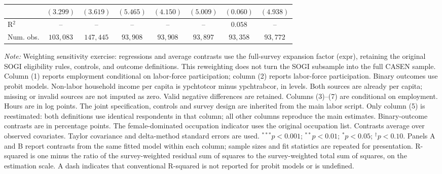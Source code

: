 \begin{table}[htpb!]
{\begin{tabular}{l c c c c c c c}
 & $(3.299)$ & $(3.619)$ & $(5.465)$ & $(4.150)$ & $(5.009)$ & $(0.060)$ & $(4.938)$ \\
\hline
R$^2$ & -- & -- & -- & -- & -- & $0.058$ & -- \\
Num. obs. & $103,083$ & $147,445$ & $93,908$ & $93,908$ & $93,897$ & $93,358$ & $93,772$ \\
\hline
\end{tabular}%
}
\par\vspace{1ex}
\begin{minipage}{\textwidth}\footnotesize\raggedright
\textit{Note:} Weighting sensitivity exercise: regressions and average contrasts use the full-survey expansion factor (expr), retaining the original SOGI eligibility rules, controls, and outcome definitions. This reweighting does not turn the SOGI subsample into the full CASEN sample. Column (1) reports employment conditional on labor-force participation; column (2) reports labor-force participation. Binary outcomes use probit models. Non-labor household income per capita is ypchtotcor minus ypchtrabcor, in levels. Both sources are already per capita; missing or invalid sources are not imputed as zero. Valid negative differences are retained.  Columns (3)--(7) are conditional on employment. Hours are in log points. The joint specification, controls and survey design are inherited from the main labor script. Only column (5) is reestimated: both definitions use identical respondents in that column; all other columns reproduce the main estimates. Binary-outcome contrasts are in percentage points. The female-dominated occupation indicator uses the original occupation list. Contrasts average over observed covariates. Taylor covariance and delta-method standard errors are used. $^{***}p<0.001$; $^{**}p<0.01$; $^{*}p<0.05$; $^{\dagger}p<0.10$. Panels A and B report contrasts from the same fitted model within each column; sample sizes and fit statistics are repeated for presentation. R-squared is one minus the ratio of the survey-weighted residual sum of squares to the survey-weighted total sum of squares, on the estimation scale. A dash indicates that conventional R-squared is not reported for probit models or is undefined.
\end{minipage}
\end{table}
